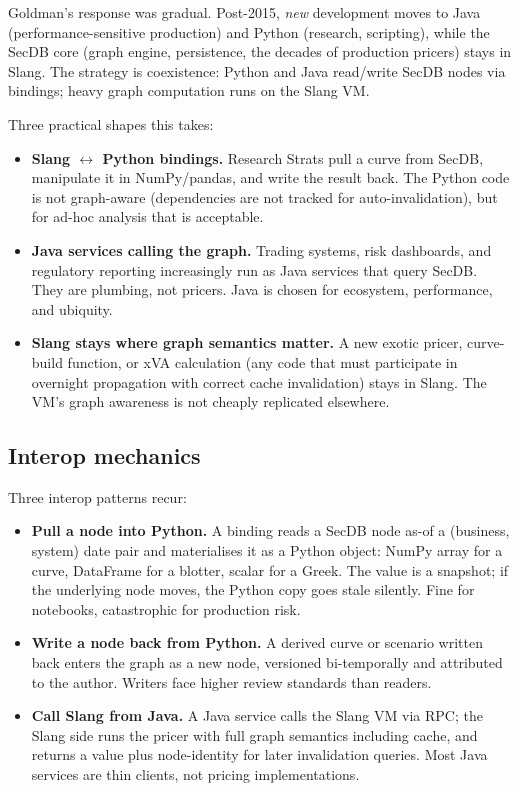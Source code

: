 Goldman's response was gradual.  Post-2015, \emph{new} development
moves to Java (performance-sensitive production) and Python
(research, scripting), while the SecDB core (graph engine,
persistence, the decades of production pricers) stays in Slang.
The strategy is coexistence: Python and Java read/write SecDB
nodes via bindings; heavy graph computation runs on the Slang VM.

Three practical shapes this takes:
\begin{itemize}
  \item \textbf{Slang $\leftrightarrow$ Python bindings.}  Research
    Strats pull a curve from SecDB, manipulate it in NumPy/pandas,
    and write the result back.  The Python code is not graph-aware
    (dependencies are not tracked for auto-invalidation), but
    for ad-hoc analysis that is acceptable.
  \item \textbf{Java services calling the graph.}  Trading systems,
    risk dashboards, and regulatory reporting increasingly run as
    Java services that query SecDB.  They are plumbing, not
    pricers.  Java is chosen for ecosystem, performance, and
    ubiquity.
  \item \textbf{Slang stays where graph semantics matter.}  A new
    exotic pricer, curve-build function, or xVA calculation (any
    code that must participate in overnight propagation with
    correct cache invalidation) stays in Slang.  The VM's graph
    awareness is not cheaply replicated elsewhere.
\end{itemize}
\subsection{Interop mechanics}

Three interop patterns recur:
\begin{itemize}
  \item \textbf{Pull a node into Python.}  A binding reads a SecDB
    node as-of a (business, system) date pair and materialises it
    as a Python object: NumPy array for a curve, DataFrame for
    a blotter, scalar for a Greek.  The value is a snapshot; if
    the underlying node moves, the Python copy goes stale
    silently.  Fine for notebooks, catastrophic for production
    risk.
  \item \textbf{Write a node back from Python.}  A derived curve
    or scenario written back enters the graph as a new node,
    versioned bi-temporally and attributed to the author.  Writers
    face higher review standards than readers.
  \item \textbf{Call Slang from Java.}  A Java service calls the
    Slang VM via RPC; the Slang side runs the pricer with full
    graph semantics including cache, and returns a value plus
    node-identity for later invalidation queries.  Most Java
    services are thin clients, not pricing implementations.
\end{itemize}

